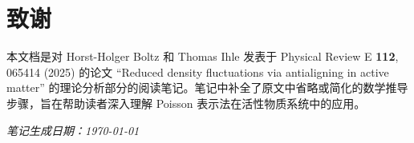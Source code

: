 
\section*{致谢}

本文档是对 Horst-Holger Boltz 和 Thomas Ihle 发表于 Physical Review E \textbf{112}, 065414 (2025) 的论文 ``Reduced density fluctuations via antialigning in active matter'' 的理论分析部分的阅读笔记。笔记中补全了原文中省略或简化的数学推导步骤，旨在帮助读者深入理解 Poisson 表示法在活性物质系统中的应用。

\bigskip
\noindent\textit{笔记生成日期：\today}
